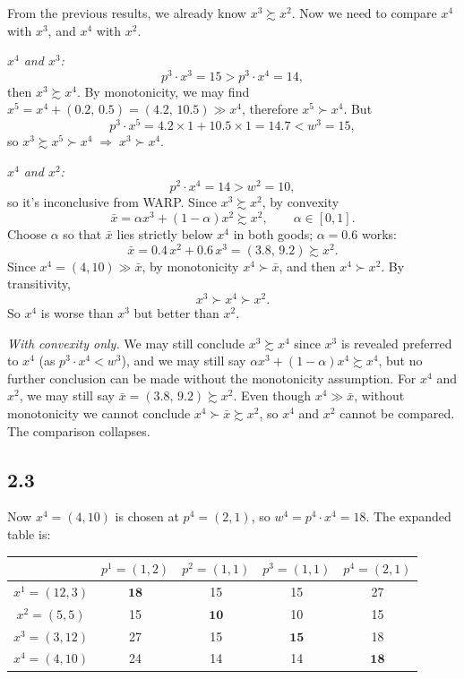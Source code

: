 \documentclass[12pt,letterpaper]{article}
\begin{document}
From the previous results, we already know $x^3 \succsim x^2$. Now we need to compare $x^4$ with $x^3$, and $x^4$ with $x^2$.

\textit{$x^4$ and $x^3$:}
\[
p^3\cdot x^3 = 15 > p^3\cdot x^4 = 14,
\]
then $x^3 \succsim x^4$. By monotonicity, we may find $x^5 = x^4 + (0.2,\,0.5) = (4.2,\,10.5) \gg x^4$, therefore $x^5 \succ x^4$. But
\[
p^3\cdot x^5 = 4.2\times 1 + 10.5\times 1 = 14.7 < w^3 = 15,
\]
so $x^3 \succsim x^5 \succ x^4 \;\Longrightarrow\; x^3 \succ x^4$.

\textit{$x^4$ and $x^2$:}
\[
p^2\cdot x^4 = 14 > w^2 = 10,
\]
so it's inconclusive from WARP. Since $x^3 \succsim x^2$, by convexity
\[
\bar{x} = \alpha x^3 + (1-\alpha)x^2 \succsim x^2, \qquad \alpha\in[0,1].
\]
Choose $\alpha$ so that $\bar{x}$ lies strictly below $x^4$ in both goods; $\alpha = 0.6$ works:
\[
\bar{x} = 0.4\,x^2 + 0.6\,x^3 = (3.8,\,9.2) \succsim x^2 .
\]
Since $x^4 = (4,10) \gg \bar{x}$, by monotonicity $x^4 \succ \bar{x}$, and then $x^4 \succ x^2$. By transitivity,
\[
x^3 \succ x^4 \succ x^2 .
\]
So $x^4$ is worse than $x^3$ but better than $x^2$.

\textit{With convexity only.} We may still conclude $x^3 \succsim x^4$ since $x^3$ is revealed preferred to $x^4$ (as $p^3\cdot x^4 < w^3$), and we may still say $\alpha x^3 + (1-\alpha)x^4 \succsim x^4$, but no further conclusion can be made without the monotonicity assumption. For $x^4$ and $x^2$, we may still say $\bar{x} = (3.8,\,9.2) \succsim x^2$. Even though $x^4 \gg \bar{x}$, without monotonicity we cannot conclude $x^4 \succ \bar{x} \succsim x^2$, so $x^4$ and $x^2$ cannot be compared. The comparison collapses.

\subsection*{2.3}

Now $x^4 = (4,10)$ is chosen at $p^4 = (2,1)$, so $w^4 = p^4\cdot x^4 = 18$. The expanded table is:

\begin{center}
\begin{tabular}{c|cccc}
 & $p^1=(1,2)$ & $p^2=(1,1)$ & $p^3=(1,1)$ & $p^4=(2,1)$ \\ \hline
$x^1=(12,3)$ & $\mathbf{18}$ & 15 & 15 & 27 \\
$x^2=(5,5)$  & 15 & $\mathbf{10}$ & 10 & 15 \\
$x^3=(3,12)$ & 27 & 15 & $\mathbf{15}$ & 18 \\
$x^4=(4,10)$ & 24 & 14 & 14 & $\mathbf{18}$
\end{tabular}
\end{center}
\end{document}
